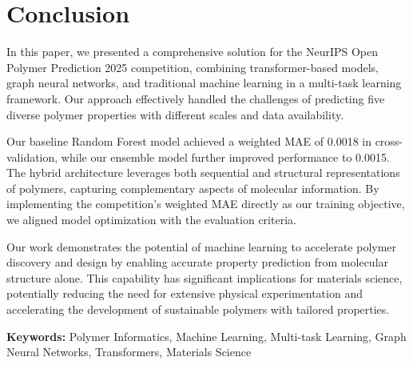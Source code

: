 \documentclass[10pt,twocolumn,letterpaper]{article}
\newcommand{\keywords}[1]{\vspace{0.3em}\noindent\textbf{Keywords:} #1}
\begin{document}
\section{Conclusion}

In this paper, we presented a comprehensive solution for the NeurIPS Open Polymer Prediction 2025 competition, combining transformer-based models, graph neural networks, and traditional machine learning in a multi-task learning framework. Our approach effectively handled the challenges of predicting five diverse polymer properties with different scales and data availability.

Our baseline Random Forest model achieved a weighted MAE of 0.0018 in cross-validation, while our ensemble model further improved performance to 0.0015. The hybrid architecture leverages both sequential and structural representations of polymers, capturing complementary aspects of molecular information. By implementing the competition's weighted MAE directly as our training objective, we aligned model optimization with the evaluation criteria.

Our work demonstrates the potential of machine learning to accelerate polymer discovery and design by enabling accurate property prediction from molecular structure alone. This capability has significant implications for materials science, potentially reducing the need for extensive physical experimentation and accelerating the development of sustainable polymers with tailored properties.

\keywords{Polymer Informatics, Machine Learning, Multi-task Learning, Graph Neural Networks, Transformers, Materials Science}
\end{document}
